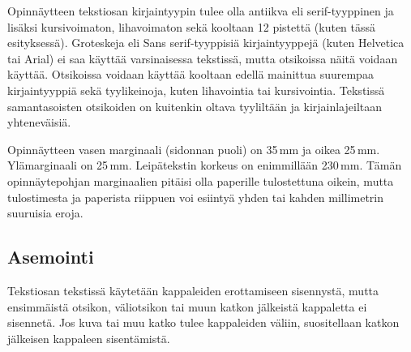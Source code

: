 \documentclass[english, 12pt, a4paper, sci, utf8, a-1b, online]{aaltothesis}
\begin{document}
Opinnäytteen tekstiosan kirjaintyypin tulee olla antiikva eli
serif\--tyyp\-pi\-nen ja lisäksi kursivoimaton, lihavoimaton sekä kooltaan 12
pistettä (kuten tässä esityksessä). Groteskeja eli \textsf{Sans serif}-tyyppisiä
kirjaintyyppejä (kuten Helvetica tai Arial) ei saa käyttää varsinaisessa
tekstissä, mutta otsikoissa näitä voidaan käyttää.  Otsikoissa voidaan käyttää
kooltaan edellä mainittua suurempaa kirjaintyyppiä sekä tyylikeinoja, kuten
lihavointia tai kursivointia. Tekstissä samantasoisten otsikoiden on kuitenkin
oltava tyyliltään ja kirjainlajeiltaan yhteneväisiä.

\begin{table}[htb]
\caption{Taulukoissa ja kuvissa kirjaintyypin voi valita
tarkoituksenmukaisesti, mutta kuva- ja taulukkoteksteissä tulee
käyttää samaa kirjaintyyppiä kuin varsinaisessa tekstissä. 
Huomaa taulukon numeroinnin sijoittuminen taulukon yläpuolelle. \label{taulukko1}}
\centering
{}
\end{table}

Opinnäytteen vasen marginaali (sidonnan puoli) on
35\,mm %
ja oikea 25\,mm. Ylämarginaali on 25\,mm. Leipätekstin korkeus on
enimmillään 230\,mm. Tämän opinnäytepohjan marginaalien pitäisi olla
paperille tulostettuna oikein, mutta tulostimesta ja paperista
riippuen voi esiintyä yhden tai kahden millimetrin suuruisia eroja.
\subsection{Asemointi}

Tekstiosan tekstissä käytetään kappaleiden erottamiseen sisennystä,
mutta ensimmäistä otsikon, väliotsikon tai muun katkon jälkeistä
kappaletta ei sisennetä. Jos kuva tai muu katko tulee kappaleiden
väliin, suositellaan katkon jälkeisen kappaleen sisentämistä.
\end{document}
